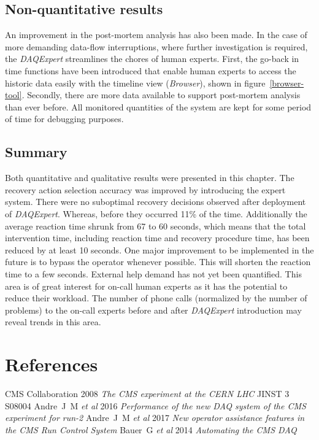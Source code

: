 \documentclass[a4paper]{jpconf}
\begin{document}
\subsection{Non-quantitative results}
An improvement in the post-mortem analysis has also been made. In the case of more demanding data-flow interruptions, where further investigation is required, the{ \it DAQExpert} streamlines the chores of human experts. First, the go-back in time functions have been introduced that enable human experts to access the historic data easily with the timeline view ({\it Browser}), shown in figure~\ref {browser-tool}. Secondly, there are more data available to support post-mortem analysis than ever before. All monitored quantities of the system are kept for some period of time for debugging purposes.

\subsection{Summary}
Both quantitative and qualitative results were presented in this chapter. The recovery action selection accuracy was improved by introducing the expert system. There were no suboptimal recovery decisions observed after deployment of {\it DAQExpert}. Whereas, before they occurred 11\% of the time. Additionally the average reaction time shrunk from 67 to 60 seconds, which means that the total intervention time, including reaction time and recovery procedure time, has been reduced by at least 10 seconds. One major improvement to be implemented in the future is to bypass the operator whenever possible. This will shorten the reaction time to a few seconds.
External help demand has not yet been quantified. This area is of great interest for on-call human experts as it has the potential to reduce their workload. The number of phone calls (normalized by the number of problems) to the on-call experts before and after {\it DAQExpert} introduction may reveal trends in this area.


\section*{References}
\begin{thebibliography}{9}

 CMS Collaboration 2008 {\it The CMS experiment at the CERN LHC} JINST 3 S08004
 Andre~J~M {\it et al} 2016 {\it Performance of the new DAQ system of the CMS experiment for run-2}
 Andre~J~M {\it et al} 2017 {\it New operator assistance features in the CMS Run Control System}
 Bauer~G {\it et al} 2014 {\it Automating the CMS DAQ}
\end{thebibliography}
\end{document}
